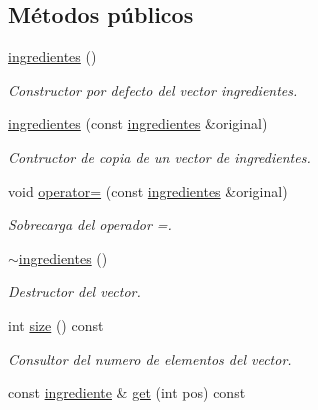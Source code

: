 \subsection*{Métodos públicos}
\begin{DoxyCompactItemize}
\item 
\mbox{\label{classingredientes_adb3e000aa798184c7253c401f165c1a5}} 
\hyperlink{classingredientes_adb3e000aa798184c7253c401f165c1a5}{ingredientes} ()
\begin{DoxyCompactList}\small\item\em Constructor por defecto del vector ingredientes. \end{DoxyCompactList}\item 
\mbox{\label{classingredientes_a7470e2be68c17cfa3193f4cf2cb57872}} 
\hyperlink{classingredientes_a7470e2be68c17cfa3193f4cf2cb57872}{ingredientes} (const \hyperlink{classingredientes}{ingredientes} \&original)
\begin{DoxyCompactList}\small\item\em Contructor de copia de un vector de ingredientes. \end{DoxyCompactList}\item 
void \hyperlink{classingredientes_ab5478a896ab96486a86dfb1b5707c565}{operator=} (const \hyperlink{classingredientes}{ingredientes} \&original)
\begin{DoxyCompactList}\small\item\em Sobrecarga del operador =. \end{DoxyCompactList}\item 
\mbox{\label{classingredientes_a91a5e8d5d27853f07314a97928500dfe}} 
\hyperlink{classingredientes_a91a5e8d5d27853f07314a97928500dfe}{$\sim$ingredientes} ()
\begin{DoxyCompactList}\small\item\em Destructor del vector. \end{DoxyCompactList}\item 
int \hyperlink{classingredientes_aaf628d0360800484ae277fbb7aa2f81d}{size} () const
\begin{DoxyCompactList}\small\item\em Consultor del numero de elementos del vector. \end{DoxyCompactList}\item 
const \hyperlink{classingrediente}{ingrediente} \& \hyperlink{classingredientes_a2d4257359160b39365b1aac2ec6a1166}{get} (int pos) const

\end{DoxyCompactItemize}
